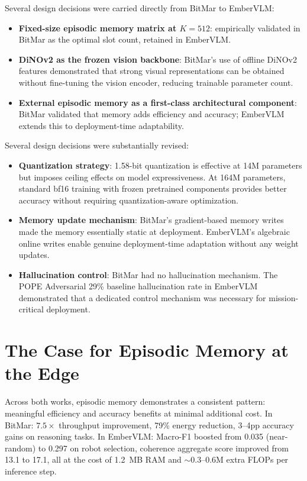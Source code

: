 Several design decisions were carried directly from BitMar to EmberVLM:
\begin{itemize}
    \item \textbf{Fixed-size episodic memory matrix at $K{=}512$}: empirically validated in BitMar as the optimal slot count, retained in EmberVLM.
    \item \textbf{DiNOv2 as the frozen vision backbone}: BitMar's use of offline DiNOv2 features demonstrated that strong visual representations can be obtained without fine-tuning the vision encoder, reducing trainable parameter count.
    \item \textbf{External episodic memory as a first-class architectural component}: BitMar validated that memory adds efficiency and accuracy; EmberVLM extends this to deployment-time adaptability.
\end{itemize}

Several design decisions were substantially revised:
\begin{itemize}
    \item \textbf{Quantization strategy}: 1.58-bit quantization is effective at 14M parameters but imposes ceiling effects on model expressiveness. At 164M parameters, standard bf16 training with frozen pretrained components provides better accuracy without requiring quantization-aware optimization.
    \item \textbf{Memory update mechanism}: BitMar's gradient-based memory writes made the memory essentially static at deployment. EmberVLM's algebraic online writes enable genuine deployment-time adaptation without any weight updates.
    \item \textbf{Hallucination control}: BitMar had no hallucination mechanism. The POPE Adversarial 29\% baseline hallucination rate in EmberVLM demonstrated that a dedicated control mechanism was necessary for mission-critical deployment.
\end{itemize}

\section{The Case for Episodic Memory at the Edge}
\label{sec:disc_memory_case}

Across both works, episodic memory demonstrates a consistent pattern: meaningful efficiency and accuracy benefits at minimal additional cost. In BitMar: $7.5\times$ throughput improvement, 79\% energy reduction, 3--4pp accuracy gains on reasoning tasks. In EmberVLM: Macro-F1 boosted from 0.035 (near-random) to 0.297 on robot selection, coherence aggregate score improved from 13.1 to 17.1, all at the cost of 1.2~MB RAM and $\sim$0.3--0.6M extra FLOPs per inference step.

